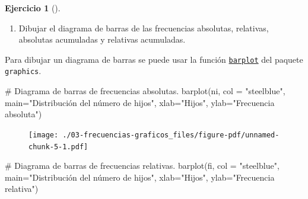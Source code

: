 \documentclass[
  a4paper,
]{scrreport}
\newenvironment{Shaded}{\begin{snugshade}}{\end{snugshade}}
\newcommand{\AttributeTok}[1]{\textcolor[rgb]{0.40,0.45,0.13}{#1}}
\newcommand{\CommentTok}[1]{\textcolor[rgb]{0.37,0.37,0.37}{#1}}
\newcommand{\FunctionTok}[1]{\textcolor[rgb]{0.28,0.35,0.67}{#1}}
\newcommand{\NormalTok}[1]{\textcolor[rgb]{0.00,0.23,0.31}{#1}}
\newcommand{\StringTok}[1]{\textcolor[rgb]{0.13,0.47,0.30}{#1}}
\providecommand{\tightlist}{%
  \setlength{\itemsep}{0pt}\setlength{\parskip}{0pt}}\usepackage{longtable,booktabs,array}
\theoremstyle{definition}
\newtheorem{exercise}{Ejercicio}[chapter]
\theoremstyle{remark}
\begin{document}
\begin{exercise}[]
\begin{tcolorbox}
\end{tcolorbox}

\begin{enumerate}
\def\labelenumi{\alph{enumi}.}
\setcounter{enumi}{2}
\tightlist
\item
  Dibujar el diagrama de barras de las frecuencias absolutas, relativas,
  absolutas acumuladas y relativas acumuladas.
\end{enumerate}

\begin{tcolorbox}[enhanced jigsaw, rightrule=.15mm, toptitle=1mm, colbacktitle=quarto-callout-tip-color!10!white, titlerule=0mm, colback=white, leftrule=.75mm, bottomtitle=1mm, colframe=quarto-callout-tip-color-frame, breakable, title=\textcolor{quarto-callout-tip-color}{\faLightbulb}\hspace{0.5em}{Solución 1}, arc=.35mm, coltitle=black, opacityback=0, bottomrule=.15mm, opacitybacktitle=0.6, left=2mm, toprule=.15mm]

Para dibujar un diagrama de barras se puede usar la función
\href{https://www.rdocumentation.org/packages/graphics/versions/3.6.2/topics/barplot}{\texttt{barplot}}
del paquete \texttt{graphics}.

\begin{Shaded}
\begin{Highlighting}[]
\CommentTok{\# Diagrama de barras de frecuencias absolutas.}
\FunctionTok{barplot}\NormalTok{(ni, }\AttributeTok{col =} \StringTok{"steelblue"}\NormalTok{, }\AttributeTok{main=}\StringTok{"Distribución del número de hijos"}\NormalTok{, }\AttributeTok{xlab=}\StringTok{"Hijos"}\NormalTok{, }\AttributeTok{ylab=}\StringTok{"Frecuencia absoluta"}\NormalTok{)}
\end{Highlighting}
\end{Shaded}

\begin{figure}[H]

{\centering \texttt{[image: ./03-frecuencias-graficos\_files/figure-pdf/unnamed-chunk-5-1.pdf]}

}

\end{figure}

\begin{Shaded}
\begin{Highlighting}[]
\CommentTok{\# Diagrama de barras de frecuencias relativas.}
\FunctionTok{barplot}\NormalTok{(fi, }\AttributeTok{col =} \StringTok{"steelblue"}\NormalTok{, }\AttributeTok{main=}\StringTok{"Distribución del número de hijos"}\NormalTok{, }\AttributeTok{xlab=}\StringTok{"Hijos"}\NormalTok{, }\AttributeTok{ylab=}\StringTok{"Frecuencia relativa"}\NormalTok{)}
\end{Highlighting}
\end{Shaded}


\end{tcolorbox}
\end{exercise}
\end{document}
